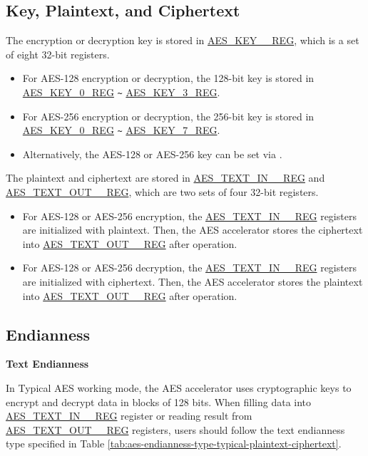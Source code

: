 \documentclass[main\_\_EN.tex]{subfiles}
\begin{document}
\subsection{Key, Plaintext, and Ciphertext}

The encryption or decryption key is stored in \hyperref[regdesc:AESKEYNREG]{AES\_KEY\_\_REG}, which is a set of eight 32-bit registers.

\begin{itemize}
    \item For AES-128 encryption or decryption, the 128-bit key is stored in \hyperref[regdesc:AESKEYNREG]{AES\_KEY\_0\_REG} \verb+~+ \hyperref[regdesc:AESKEYNREG]{AES\_KEY\_3\_REG}.
    \item For AES-256 encryption or decryption, the 256-bit key is stored in \hyperref[regdesc:AESKEYNREG]{AES\_KEY\_0\_REG} \verb+~+ \hyperref[regdesc:AESKEYNREG]{AES\_KEY\_7\_REG}.
    \item Alternatively, the AES-128 or AES-256 key can be set via .
\end{itemize}

The plaintext and ciphertext are stored in \hyperref[regdesc:AESTEXTINNREG]{AES\_TEXT\_IN\_\_REG} and \hyperref[regdesc:AESTEXTOUTNREG]{AES\_TEXT\_OUT\_\_REG}, which are two sets of four 32-bit registers.

\begin{itemize}
    \item For AES-128 or AES-256 encryption, the \hyperref[regdesc:AESTEXTINNREG]{AES\_TEXT\_IN\_\_REG} registers are initialized with plaintext. Then, the AES accelerator stores the ciphertext into \hyperref[regdesc:AESTEXTOUTNREG]{AES\_TEXT\_OUT\_\_REG} after operation.
    \item For AES-128 or AES-256 decryption, the \hyperref[regdesc:AESTEXTINNREG]{AES\_TEXT\_IN\_\_REG} registers are initialized with ciphertext. Then, the AES accelerator stores the plaintext into \hyperref[regdesc:AESTEXTOUTNREG]{AES\_TEXT\_OUT\_\_REG} after operation.
\end{itemize}


\clearpage
\subsection{Endianness}

\textbf{Text Endianness}

In Typical AES working mode, the AES accelerator uses cryptographic keys to encrypt and decrypt data in blocks of 128 bits.
When filling data into \hyperref[regdesc:AESTEXTINNREG]{AES\_TEXT\_IN\_\_REG} register or reading result from \hyperref[regdesc:AESTEXTINNREG]{AES\_TEXT\_OUT\_\_REG} registers, users should follow the text endianness type specified in Table \ref{tab:aes-endianness-type-typical-plaintext-ciphertext}.
\end{document}
